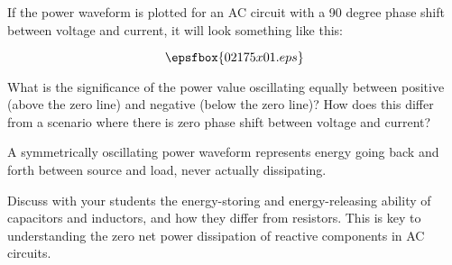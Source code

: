 

If the power waveform is plotted for an AC circuit with a 90 degree phase shift between voltage and current, it will look something like this:

$$\epsfbox{02175x01.eps}$$

What is the significance of the power value oscillating equally between positive (above the zero line) and negative (below the zero line)?  How does this differ from a scenario where there is zero phase shift between voltage and current?







A symmetrically oscillating power waveform represents energy going back and forth between source and load, never actually dissipating.







Discuss with your students the energy-storing and energy-releasing ability of capacitors and inductors, and how they differ from resistors.  This is key to understanding the zero net power dissipation of reactive components in AC circuits.




